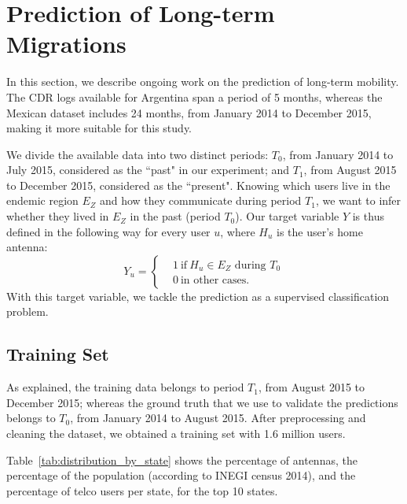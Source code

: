 





\section{Prediction of Long-term Migrations} \label{long_term}

In this section, we describe ongoing work on the prediction of long-term mobility.
The CDR logs available for Argentina span a period of 5 months, 
whereas the Mexican dataset includes 24 months, from January 2014 to December 2015, making it more suitable for this study.

We divide the available data into two distinct periods:
$T_0$, from January 2014 to July 2015, considered as the ``past" in our experiment;
and $T_1$, from August 2015 to December 2015, considered as the ``present".
Knowing which users live in the endemic region $E_Z$ and how they communicate
during period $T_1$,
we want to infer whether they lived in $E_Z$ in the past (period $T_0$).
Our target variable $Y$ is thus defined in the following way for every user $u$,
where $H_u$ is the user's home antenna: 
\[
    Y_u =
      \begin{cases}
        &1 \ \mbox{if} \ H_u \in E_Z \mbox{ during } T_0 \\
        &0 \ \mbox{in other cases}.
      \end{cases}
    \]
With this target variable, we tackle the prediction as a supervised classification problem.


\subsection{Training Set}

As explained, the training data belongs to period $T_1$, from August 2015 to December 2015;
whereas the ground truth that we use to validate the predictions belongs to $T_0$, from January 2014 to August 2015.
After preprocessing and cleaning the dataset, we obtained 
a training set with 1.6 million users.

Table~\ref{tab:distribution_by_state} shows the percentage of antennas, the percentage of the population (according to INEGI census 2014), and
the percentage of telco users per state, for the top 10 states.


